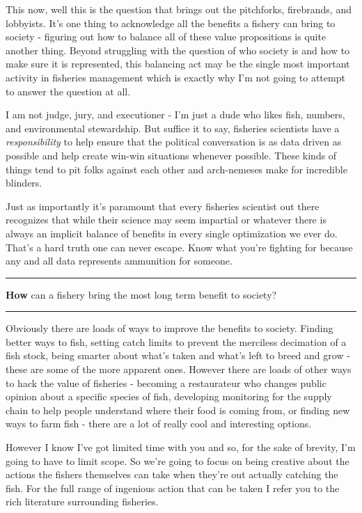 \documentclass[11pt,a5paper]{book}
\begin{document}
This now, well this is the question that brings out the pitchforks, firebrands, and lobbyists. It's one thing to acknowledge all the benefits a fishery can bring to society - figuring out how to balance all of these value propositions is quite another thing. Beyond struggling with the question of who society is and how to make sure it is represented, this balancing act may be the single most important activity in fisheries management which is exactly why I'm not going to attempt to answer the question at all. 
\newline

I am not judge, jury, and executioner - I'm just a dude who likes fish, numbers, and environmental stewardship. But suffice it to say, fisheries scientists have a \textit{responsibility} to help ensure that the political conversation is as data driven as possible and help create win-win situations whenever possible. These kinds of things tend to pit folks against each other and arch-nemeses make for incredible blinders.
\newline

Just as importantly it's paramount that every fisheries scientist out there recognizes that while their science may seem impartial or whatever there is always an implicit balance of benefits in every single optimization we ever do. That's a hard truth one can never escape. Know what you're fighting for because any and all data represents ammunition for someone. 
\newpage

\noindent \rule{\textwidth}{0.5pt} 
\noindent \textbf{How} can a fishery bring the most long term benefit to society?
\newline
\rule{\textwidth}{0.5pt} 
\vspace{5pt}

Obviously there are loads of ways to improve the benefits to society. Finding better ways to fish, setting catch limits to prevent the merciless decimation of a fish stock, being smarter about what's taken and what's left to breed and grow - these are some of the more apparent ones. However there are loads of other ways to hack the value of fisheries - becoming a restaurateur who changes public opinion about a specific species of fish, developing monitoring for the supply chain to help people understand where their food is coming from, or finding new ways to farm fish - there are a lot of really cool and interesting options. 
\newline

However I know I've got limited time with you and so, for the sake of brevity, I'm going to have to limit scope. So we're going to focus on being creative about the actions the fishers themselves can take when they're out actually catching the fish. For the full range of ingenious action that can be taken I refer you to the rich literature surrounding fisheries. 
\newpage
\end{document}
